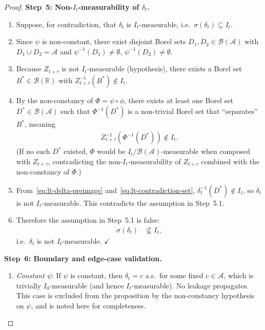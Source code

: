 \documentclass[12pt,openany]{book}
\newcommand{\calI}{\mathcal{I}}
\numberwithin{equation}{chapter}
\theoremstyle{plain}
\theoremstyle{definition}
\theoremstyle{remark}
\numberwithin{equation}{chapter}
\theoremstyle{plain}
\def\calI{I}%
\begin{document}
\begin{proof}
\medskip
\noindent\textbf{Step~5: Non-$\calI_t$-measurability of
$\delta_t$.}
\begin{enumerate}
  \item Suppose, for contradiction, that $\delta_t$ is
        $\calI_t$-measurable, i.e.\
        $\sigma(\delta_t) \subseteq \calI_t$.
  \item Since $\psi$ is non-constant, there exist disjoint
        Borel sets $D_1, D_2 \in \mathcal{B}(\mathcal{A})$
        with $D_1 \cup D_2 = \mathcal{A}$ and
        $\psi^{-1}(D_1) \neq \emptyset$,
        $\psi^{-1}(D_2) \neq \emptyset$.
  \item Because $Z_{t+\tau}$ is not $\calI_t$-measurable
        (hypothesis), there exists a Borel set
        $B^* \in \mathcal{B}(\mathbb{R})$ with
        $Z_{t+\tau}^{-1}(B^*) \notin \calI_t$.
  \item By the non-constancy of $\Phi = \psi \circ \phi$,
        there exists at least one Borel set
        $D^* \in \mathcal{B}(\mathcal{A})$ such that
        $\Phi^{-1}(D^*)$ is a non-trivial Borel set that
        ``separates'' $B^*$, meaning
        \begin{align}
          Z_{t+\tau}^{-1}(\Phi^{-1}(D^*)) \notin \calI_t.
          \label{eq:lt-contradiction-set}
        \end{align}
        (If no such $D^*$ existed, $\Phi$ would be
        $\calI_t / \mathcal{B}(\mathcal{A})$-measurable
        when composed with $Z_{t+\tau}$, contradicting the
        non-$\calI_t$-measurability of $Z_{t+\tau}$ combined
        with the non-constancy of $\Phi$.)
  \item From~\eqref{eq:lt-delta-preimage} and~\eqref{eq:lt-contradiction-set},
        $\delta_t^{-1}(D^*) \notin \calI_t$, so
        $\delta_t$ is not $\calI_t$-measurable.  This
        contradicts the assumption in Step~5.1.
  \item Therefore the assumption in Step~5.1 is false:
        \begin{align}
          \sigma(\delta_t) &\not\subseteq \calI_t,
          \label{eq:lt-delta-not-measurable}
        \end{align}
        i.e.\ $\delta_t$ is not $\calI_t$-measurable.
        $\checkmark$
\end{enumerate}

\medskip
\noindent\textbf{Step~6: Boundary and edge-case validation.}
\begin{enumerate}
  \item \emph{Constant $\psi$}: If $\psi$ is constant, then
        $\delta_t = c$ a.s.\ for some fixed $c \in \mathcal{A}$,
        which is trivially $\calI_0$-measurable (and hence
        $\calI_t$-measurable).  No leakage propagates.  This
        case is excluded from the proposition by the
        non-constancy hypothesis on $\psi$, and is noted here
        for completeness.


\end{enumerate}
\end{proof}
\end{document}
